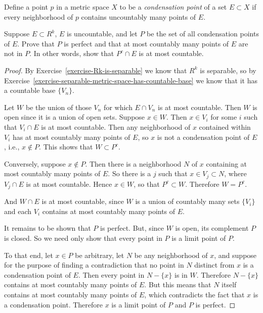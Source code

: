  Define a point $p$ in a metric space $X$ to be a {\em
  condensation point} of a set $E\subset X$ if every neighborhood of
$p$ contains uncountably many points of $E$.

Suppose $E\subset R^k$, $E$ is uncountable, and let $P$ be the set of
all condensation points of $E$. Prove that $P$ is perfect and that at
most countably many points of $E$ are not in $P$. In other words, show
that $P^c\cap E$ is at most countable.
\begin{proof}
  By Exercise~\ref{exercise-Rk-is-separable} we know that $R^k$ is
  separable, so by
  Exercise~\ref{exercise-separable-metric-space-has-countable-base} we
  know that it has a countable base $\{V_n\}$.

  Let $W$ be the union of those $V_n$ for which $E\cap V_n$ is at most
  countable. Then $W$ is open since it is a union of open
  sets. Suppose $x\in W$. Then $x\in V_i$ for some $i$ such that
  $V_i\cap E$ is at most countable. Then any neighborhood of $x$
  contained within $V_i$ has at most countably many points of $E$, so
  $x$ is not a condensation point of $E$, i.e., $x\not\in P$. This
  shows that $W\subset P^c$.

  Conversely, suppose $x\not\in P$. Then there is a neighborhood $N$
  of $x$ containing at most countably many points of $E$. So there is
  a $j$ such that $x\in V_j\subset N$, where $V_j\cap E$ is at most
  countable. Hence $x\in W$, so that $P^c\subset W$. Therefore
  $W = P^c$.

  And $W\cap E$ is at most countable, since $W$ is a union of
  countably many sets $\{V_i\}$ and each $V_i$ contains at most
  countably many points of $E$.

  It remains to be shown that $P$ is perfect. But, since $W$ is open,
  its complement $P$ is closed. So we need only show that every point
  in $P$ is a limit point of $P$.

  To that end, let $x\in P$ be arbitrary, let $N$ be any neighborhood
  of $x$, and suppose for the purpose of finding a contradiction that
  no point in $N$ distinct from $x$ is a condensation point of
  $E$. Then every point in $N-\{x\}$ is in $W$. Therefore $N-\{x\}$
  contains at most countably many points of $E$. But this means that
  $N$ itself contains at most countably many points of $E$, which
  contradicts the fact that $x$ is a condensation point. Therefore $x$
  is a limit point of $P$ and $P$ is perfect.
\end{proof}

